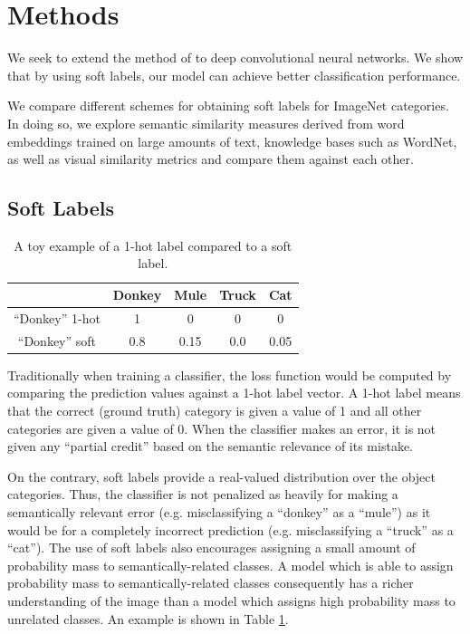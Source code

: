 \section{Methods}

We seek to extend the method of \cite{zhao2011large} to deep convolutional
neural networks.  We show that by using soft labels, our model can achieve
better classification performance.



We compare different schemes for obtaining soft labels for ImageNet
categories.  In doing so, we explore semantic similarity measures derived from
word embeddings trained on large amounts of text, knowledge bases such as 
WordNet, as well as visual similarity metrics and compare them against each
other.


\subsection{Soft Labels}
\label{sec:soft_labels}

\begin{table}[!tb]
  \centering
  \begin{tabular}{|c|c|c|c|c|}
    \hline
      & Donkey & Mule & Truck & Cat \\
    \hline
      ``Donkey'' 1-hot & 1 & 0 & 0 & 0 \\
    \hline
      ``Donkey'' soft & 0.8 & 0.15 & 0.0 & 0.05 \\
    \hline
  \end{tabular}
  \caption{
    A toy example of a 1-hot label compared to a soft label.
  }
  \label{tbl:soft_labels}
\end{table}

Traditionally when training a classifier, the loss function would be computed
by comparing the prediction values against a 1-hot label vector.
A 1-hot label means that the correct (ground truth) category is given a value
of 1 and all other categories are given a value of 0.
When the classifier makes an error, it is not given any ``partial credit''
based on the semantic relevance of its mistake.

On the contrary, soft labels provide a real-valued distribution over
the object categories. Thus, the classifier is not penalized as
heavily for making a semantically relevant error (e.g. misclassifying
a ``donkey'' as a ``mule'') as it would be for a completely incorrect
prediction (e.g. misclassifying a ``truck'' as a ``cat''). The use of
soft labels also encourages assigning a small amount of probability
mass to semantically-related classes. A model which is able to assign
probability mass to semantically-related classes consequently has a richer
understanding of the image than a model which assigns high probability mass to
unrelated classes. An example is shown in Table \ref{tbl:soft_labels}.

